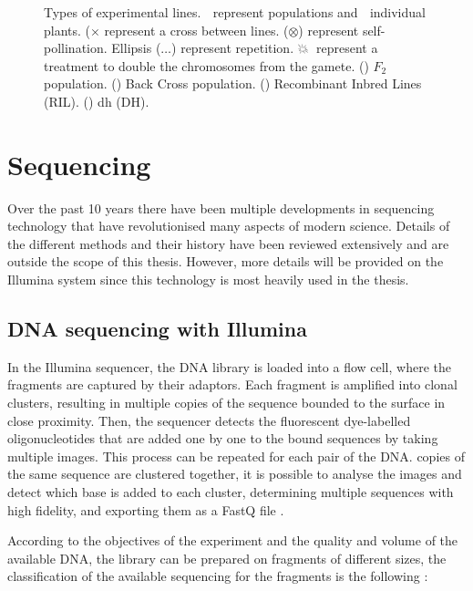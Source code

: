 \begin{figure}
\caption[Types of experimental lines]{Types of experimental lines. 🌾 represent populations and 🌱 individual plants. ($\times$ represent a cross between lines. ($\otimes$) represent self-pollination. Ellipsis ($\ldots$) represent repetition. 💥🌰 represent a treatment to double the chromosomes from the gamete. () $F_{2}$ population. () Back Cross population. () Recombinant Inbred Lines (RIL). () \acrlong{dh} (DH).}
\end{figure}


\section{Sequencing} 
Over the past 10 years there have been multiple developments in sequencing technology that have revolutionised many aspects of modern science. Details of the different methods and their history have been reviewed extensively \citep{Goodwin2016} and are outside the scope of this thesis. 
However, more details will be provided on the Illumina system since this technology is most heavily used in the thesis. 

\subsection{DNA sequencing with Illumina}

In the Illumina sequencer, the DNA library is loaded into a flow cell, where the fragments are captured by their adaptors. 
Each fragment is amplified into clonal clusters, resulting in multiple copies of the sequence bounded to the surface in close proximity. 
Then, the sequencer detects the fluorescent dye-labelled oligonucleotides that are added one by one to the bound sequences by taking multiple images. 
This process can be repeated for each pair of the DNA. 
copies of the same sequence are clustered together, it is possible to analyse the images and detect which base is added to each cluster, determining multiple sequences with high fidelity, and exporting them as a FastQ file \citep{Goodwin2016,RNAseqlopedia, truseq}.


According to the objectives of the experiment and the quality and volume of the available DNA, the library can be prepared on fragments of different sizes, the classification of the available sequencing for the fragments is the following \cite{Myllykangas2012,Metzker2010,Shendure2008,Hutchison2007}:

